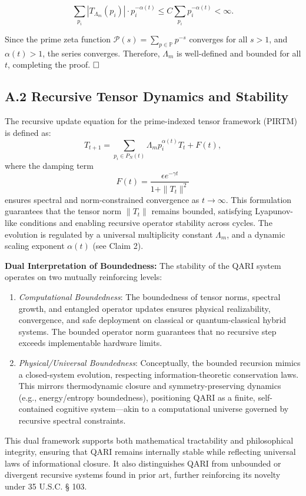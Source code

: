 \documentclass[12pt]{article}
\begin{document}
\begin{itemize}
\[
\sum_{p_i} |T_{\Lambda_m}(p_i)| \cdot p_i^{-\alpha(t)} \leq C \sum_{p_i} p_i^{-\alpha(t)} < \infty.
\]

Since the prime zeta function \(\mathcal{P}(s) = \sum_{p \in \mathbb{P}} p^{-s}\) converges for all \(s > 1\), and \(\alpha(t) > 1\), the series converges. Therefore, \(\Lambda_m\) is well-defined and bounded for all \(t\), completing the proof. \(\hfill \square\)

\subsection*{A.2 Recursive Tensor Dynamics and Stability}

The recursive update equation for the prime-indexed tensor framework (PIRTM) is defined as:
\[
T_{t+1} = \sum_{p_i \in P_N(t)} \Lambda_m p_i^{\alpha(t)} T_t + F(t),
\]
where the damping term
\[
F(t) = \frac{\epsilon e^{-\gamma t}}{1 + \|T_t\|^2}
\]
ensures spectral and norm-constrained convergence as \( t \rightarrow \infty \). This formulation guarantees that the tensor norm \( \|T_t\| \) remains bounded, satisfying Lyapunov-like conditions and enabling recursive operator stability across cycles. The evolution is regulated by a universal multiplicity constant \( \Lambda_m \), and a dynamic scaling exponent \( \alpha(t) \) (see Claim 2).

\medskip

\textbf{Dual Interpretation of Boundedness:} The stability of the QARI system operates on two mutually reinforcing levels:
\begin{enumerate}
    \item \textit{Computational Boundedness}: The boundedness of tensor norms, spectral growth, and entangled operator updates ensures physical realizability, convergence, and safe deployment on classical or quantum-classical hybrid systems. The bounded operator norm guarantees that no recursive step exceeds implementable hardware limits.
    \item \textit{Physical/Universal Boundedness}: Conceptually, the bounded recursion mimics a closed-system evolution, respecting information-theoretic conservation laws. This mirrors thermodynamic closure and symmetry-preserving dynamics (e.g., energy/entropy boundedness), positioning QARI as a finite, self-contained cognitive system—akin to a computational universe governed by recursive spectral constraints.
\end{enumerate}

This dual framework supports both mathematical tractability and philosophical integrity, ensuring that QARI remains internally stable while reflecting universal laws of informational closure. It also distinguishes QARI from unbounded or divergent recursive systems found in prior art, further reinforcing its novelty under 35 U.S.C. § 103.



\end{itemize}
\end{document}
